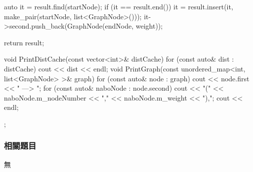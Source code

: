 \begin{Code}
{{{            auto it = result.find(startNode);
            if (it == result.end())
            {
                it = result.insert(it, make_pair(startNode, list<GraphNode>()));
            }
            it->second.push_back(GraphNode(endNode, weight));
        }

        return result;
    }
    void PrintDistCache(const vector<int>& distCache)
    {
        for (const auto& dist : distCache)
        {
            cout << dist << endl;
        }
    }
    void PrintGraph(const unordered_map<int, list<GraphNode> >& graph)
    {
        for (const auto& node : graph)
        {
            cout << node.first << " ---> ";
            for (const auto& naboNode : node.second)
            {
                cout << "(" << naboNode.m_nodeNumber << "," << naboNode.m_weight << "),";
            }
            cout << endl;
        }
    }
};
\end{Code}

\subsubsection{相關題目}
\begindot
\item 無
\myenddot
